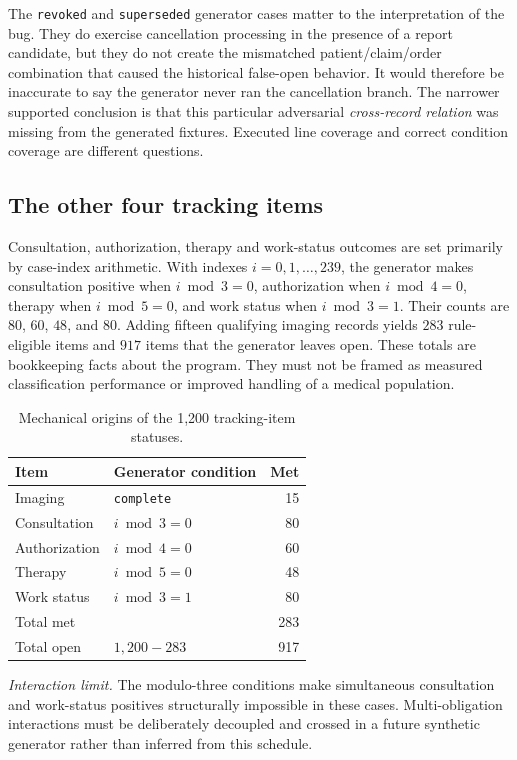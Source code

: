 \documentclass[11pt,twocolumn]{article}
\newcommand{\code}[1]{\texttt{#1}}
\begin{document}
The \code{revoked} and \code{superseded} generator cases matter to the interpretation of the bug. They do exercise cancellation processing in the presence of a report candidate, but they do not create the mismatched patient/claim/order combination that caused the historical false-open behavior. It would therefore be inaccurate to say the generator never ran the cancellation branch. The narrower supported conclusion is that this particular adversarial \emph{cross-record relation} was missing from the generated fixtures. Executed line coverage and correct condition coverage are different questions.

\subsection{The other four tracking items}
Consultation, authorization, therapy and work-status outcomes are set primarily by case-index arithmetic. With indexes $i=0,1,\ldots,239$, the generator makes consultation positive when $i\bmod3=0$, authorization when $i\bmod4=0$, therapy when $i\bmod5=0$, and work status when $i\bmod3=1$. Their counts are $80$, $60$, $48$, and $80$. Adding fifteen qualifying imaging records yields $283$ rule-eligible items and $917$ items that the generator leaves open. These totals are bookkeeping facts about the program. They must not be framed as measured classification performance or improved handling of a medical population.

\begin{table}[!t]\centering\small\caption{Mechanical origins of the 1,200 tracking-item statuses.}\label{tab:schedules}
\begin{tabular}{@{}p{}p{}r@{}}\toprule
Item & Generator condition & Met \\\midrule
Imaging & \texttt{complete} & 15 \\
Consultation & $i\bmod3=0$ & 80 \\
Authorization & $i\bmod4=0$ & 60 \\
Therapy & $i\bmod5=0$ & 48 \\
Work status & $i\bmod3=1$ & 80 \\\midrule
Total met & & 283 \\
Total open & $1,200-283$ & 917 \\\bottomrule
\end{tabular}
\end{table}

\noindent\emph{Interaction limit.} The modulo-three conditions make simultaneous consultation and work-status positives structurally impossible in these cases. Multi-obligation interactions must be deliberately decoupled and crossed in a future synthetic generator rather than inferred from this schedule.
\end{document}
